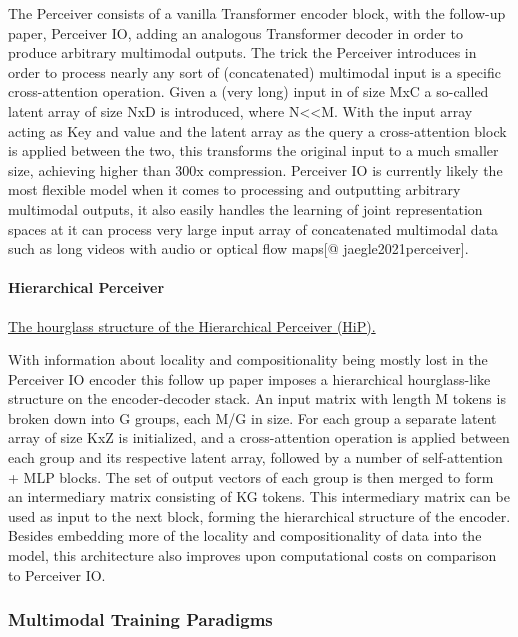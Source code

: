 \documentclass[
]{krantz}
\begin{document}
The Perceiver consists of a vanilla Transformer encoder block, with the follow-up paper, Perceiver IO, adding an analogous Transformer decoder in order to produce arbitrary multimodal outputs. The trick the Perceiver introduces in order to process nearly any sort of (concatenated) multimodal input is a specific cross-attention operation. Given a (very long) input in of size MxC a so-called latent array of size NxD is introduced, where N\textless\textless M. With the input array acting as Key and value and the latent array as the query a cross-attention block is applied between the two, this transforms the original input to a much smaller size, achieving higher than 300x compression. Perceiver IO is currently likely the most flexible model when it comes to processing and outputting arbitrary multimodal outputs, it also easily handles the learning of joint representation spaces at it can process very large input array of concatenated multimodal data such as long videos with audio or optical flow maps\citep{DBLP:conf/icml/JaegleGBVZC21}{[}@ jaegle2021perceiver{]}.

\hypertarget{hierarchical-perceiver}{%
\paragraph{Hierarchical Perceiver}\label{hierarchical-perceiver}}

\href{figures/03-01/hierarchical-perceiver.png}{The hourglass structure of the Hierarchical Perceiver (HiP)\citep{carreira2022hierarchical}.}

With information about locality and compositionality being mostly lost in the Perceiver IO encoder this follow up paper imposes a hierarchical hourglass-like structure on the encoder-decoder stack. An input matrix with length M tokens is broken down into G groups, each M/G in size. For each group a separate latent array of size KxZ is initialized, and a cross-attention operation is applied between each group and its respective latent array, followed by a number of self-attention + MLP blocks. The set of output vectors of each group is then merged to form an intermediary matrix consisting of KG tokens. This intermediary matrix can be used as input to the next block, forming the hierarchical structure of the encoder. Besides embedding more of the locality and compositionality of data into the model, this architecture also improves upon computational costs on comparison to Perceiver IO\citep{carreira2022hierarchical}.

\hypertarget{multimodal-training-paradigms}{%
\subsubsection{Multimodal Training Paradigms}\label{multimodal-training-paradigms}}
\end{document}
